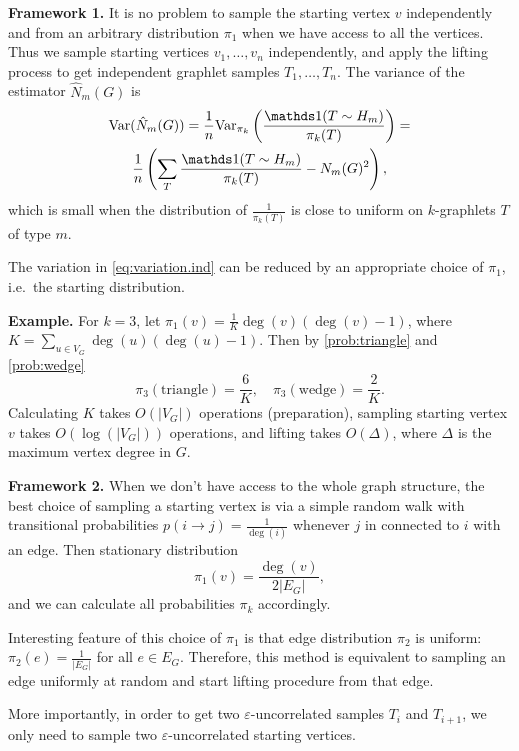 	\textbf{Framework 1.} It is no problem to sample the starting vertex $v$ independently and from an arbitrary distribution $\pi_1$ when we have access to all the vertices.
	Thus we sample starting vertices $v_1, \ldots, v_n$ independently, and apply the lifting process to get independent graphlet samples $T_1,\ldots, T_n$. 
	The variance of the estimator $\hat N_m(G)$ is 
	\begin{multline}
	\label{eq:variation.ind}
	    \Var(\hat N_m(G)) = \frac{1}{n}\Var_{\pi_k}\left(\frac{\ind(T\sim H_m)}{\pi_k(T)}\right) =\\
	    \frac{1}{n}\left(\sum_T \frac{\ind(T\sim H_m)}{\pi_k(T)} - N_m(G)^2\right),
	\end{multline}
	which is small when the distribution of  $\frac{1}{\pi_k(T)}$ is close to uniform on $k$-graphlets $T$ of type $m$.
	
	The variation in \eqref{eq:variation.ind} can be reduced by an appropriate choice of $\pi_1$, i.e.~the starting distribution.
	
	\textbf{Example.}  For $k=3$, let $\pi_1(v) = \frac{1}{K}\deg(v)(\deg(v)-1)$, where 
	$K=\sum_{u\in V_G} \deg(u)(\deg(u)-1)$. 
	Then by \eqref{prob:triangle} and \eqref{prob:wedge}
	\begin{equation*}
		\pi_3(\mathrm{triangle}) = \frac{6}{K}, \quad \pi_3(\mathrm{wedge}) = \frac{2}{K}.
	\end{equation*}
	Calculating $K$ takes $O(|V_G|)$ operations (preparation), sampling starting vertex $v$ takes $O(\log(|V_G|))$ operations, and lifting takes $O(\Delta)$, where $\Delta$ is the maximum vertex degree in $G$.

	\vskip 10pt
	\noindent
	\textbf{Framework 2.} 
	When we don't have access to the whole graph structure, the best choice of sampling a starting vertex is via a simple random walk with transitional probabilities $p(i\rightarrow j) = \frac{1}{\deg(i)}$ whenever $j$ in connected to $i$ with an edge.
	Then stationary distribution $$\pi_1(v) = \frac{\deg(v)}{2|E_G|},$$ and we can calculate all probabilities $\pi_k$ accordingly.
	
	Interesting feature of this choice of $\pi_1$ is that edge distribution $\pi_2$ is uniform: $\pi_2(e) = \frac{1}{|E_G|}$ for all $e\in E_G$. 
	Therefore, this method is equivalent to sampling an edge uniformly at random and start lifting procedure from that edge.
	
	More importantly, in order to get two $\varepsilon$-uncorrelated samples $T_i$ and $T_{i+1}$, we only need to sample two $\varepsilon$-uncorrelated starting vertices.

